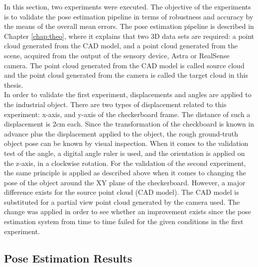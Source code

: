 In this section, two experiments were executed. The objective of the experiments is to validate the pose estimation pipeline in terms of robustness and accuracy by the means of the overall mean errors. The pose estimation pipeline is described in Chapter \ref{chap:theo}, where it explains that two 3D data sets are required: a point cloud generated from the CAD model, and a point cloud generated from the scene, acquired from the output of the sensory device, Astra or RealSense camera. The point cloud generated from the CAD model is called source cloud and the point cloud generated from the camera is called the target cloud in this thesis.\\
In order to validate the first experiment, displacements and angles are applied to the industrial object. There are two types of displacement related to this experiment: x-axis, and y-axis of the checkerboard frame. The distance of such a displacement is 2cm each. Since the transformation of the checkboard is known in advance plus the displacement applied to the object, the rough ground-truth object pose can be known by visual inspection. When it comes to the validation test of the angle, a digital angle ruler is used, and the orientation is applied on the z-axis, in a clockwise rotation. For the validation of the second experiment, the same principle is applied as described above when it comes to changing the pose of the object around the XY plane of the checkerboard. However, a major difference exists for the source point cloud (CAD model). The CAD model is substituted for a partial view point cloud generated by the camera used. The change was applied in order to see whether an improvement exists since the pose estimation system from time to time failed for the given conditions in the first experiment.

\subsection{Pose Estimation Results}
 
